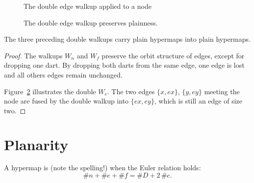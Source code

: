 \begin{figure}[htb]
\centering
{}
\caption{The double edge walkup applied to a node}
\label{fig:doubleedge}
\end{figure}

\begin{figure}[htb]
\centering
{}
\caption{The double edge walkup preserves plainness.}
\label{fig:doubleplain}
\end{figure}


\begin{lemma}  
The three preceding double walkups carry plain
hypermaps into plain hypermaps.
\end{lemma}
%

\begin{proof} The walkups $W_n$ and $W_f$ preserve the orbit structure
of edges, except for dropping one dart.  By dropping both darts from
the same edge, one edge is lost and all others edges remain
unchanged.

Figure~\ref{fig:doubleplain} illustrates the double $W_e$.  The two
edges $\{x,e x\}$, $\{y, e y\}$ meeting the node are fused by the
double walkup into $\{e x, e y\}$, which is still an edge of size
two.
\end{proof}



\section{Planarity}
%
%

\begin{definition}[planar]  A hypermap is  (note the
spelling!) when the Euler relation holds:
\begin{displaymath}\# n + \# e + \# f = \# D + 2\, \#c.\end{displaymath}
%
\end{definition}


